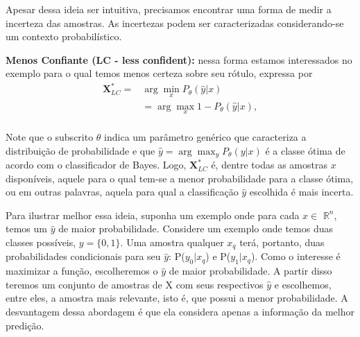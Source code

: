 Apesar dessa ideia ser intuitiva, precisamos encontrar uma forma de medir a incerteza das amostras. 
As incertezas podem ser caracterizadas considerando-se um contexto probabilístico.

\textbf{Menos Confiante (LC - less confident):} nessa forma estamos interessados no exemplo para o qual temos menos certeza sobre seu rótulo, expressa por
\begin{align*}
\textbf{X}^*_{LC} = &\arg\min_{x} P_{\theta}  (\hat{y}\lvert x)\\
& = \arg\max_{x} 1 - P_{\theta}  (\hat{y}\lvert x),\\
\end{align*}

Note que o subscrito $\theta$ indica um parâmetro genérico que caracteriza a distribuição de probabilidade e que $\hat{y} = \displaystyle \arg\max_{y} P_{\theta} (y\lvert x)$ é a classe ótima de acordo com o classificador de Bayes. Logo, $\textbf{X}^*_{LC}$ é, dentre todas as amostras $x$ disponíveis, aquele para o qual tem-se a menor probabilidade para a classe ótima, ou em outras palavras, aquela para qual a classificação $\hat{y}$ escolhida é mais incerta. 



 Para ilustrar melhor essa ideia, suponha um exemplo onde para cada $x \in$ $\mathbb{R}^n$, temos um $\hat{y}$ de maior probabilidade. Considere um exemplo onde temos duas classes possíveis, $y = \{0,1\}$. Uma amostra qualquer $x_q$ terá, portanto, duas probabilidades condicionais para seu $\hat{y}$: P($y_0 \lvert x_q$) e P($y_1 \lvert x_q$). Como o interesse é maximizar a função, escolheremos o $\hat{y}$ de maior probabilidade. A partir disso teremos um conjunto de amostras de X com seus respectivos $\hat{y}$ e escolhemos, entre eles, a amostra mais relevante, isto é, que possui a menor probabilidade. A desvantagem dessa abordagem é que ela considera apenas a informação da melhor predição.  


